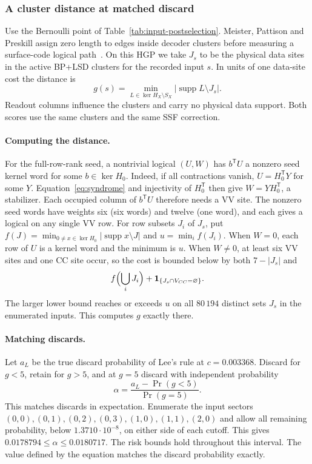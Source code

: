 \documentclass[10pt,twocolumn]{article}
\theoremstyle{definition}
\DeclareMathOperator{\supp}{supp}
\begin{document}
\subsubsection{A cluster distance at matched discard}\label{app:cluster-distance}
Use the Bernoulli point of Table~\ref{tab:input-postselection}.
Meister, Pattison and Preskill assign zero length to edges inside
decoder clusters before measuring a surface-code logical
path~\cite[Def.~9 and Alg.~2]{MPP24}. On this HGP we take $J_s$ to
be the physical data sites in the active BP+LSD clusters for the
recorded input $s$. In units of one data-site cost the distance is
\[
 g(s)=\min_{L\in\ker H_X\setminus S_X}|\supp L\setminus J_s|.
\]
Readout columns influence the clusters and carry no physical data
support. Both scores use the same clusters and the same SSF correction.

\paragraph{Computing the distance.}
For the full-row-rank seed, a nontrivial logical $(U,W)$ has
$b^{\mathsf T}U$ a nonzero seed kernel word for some $b\in\ker H_0$.
Indeed, if all contractions vanish, $U=H_0^{\mathsf T}Y$ for some
$Y$. Equation~\eqref{eq:syndrome} and injectivity of $H_0^{\mathsf T}$
then give $W=YH_0^{\mathsf T}$, a stabilizer. Each occupied column
of $b^{\mathsf T}U$ therefore needs a VV site. The nonzero seed words
have weights six (six words) and twelve (one word), and each gives a
logical on any single VV row. For row subsets $J_i$ of $J_s$, put
$f(J)=\min_{0\ne x\in\ker H_0}|\supp x\setminus J|$ and
$u=\min_i f(J_i)$. When $W=0$, each row of $U$ is a kernel word and
the minimum is $u$. When $W\ne0$, at least six VV sites and one CC
site occur, so the cost is bounded below by both $7-|J_s|$ and
\[
 f\Bigl(\bigcup_iJ_i\Bigr)+\mathbf1_{\{J_s\cap V_{CC}=\varnothing\}}.
\]
The larger lower bound reaches or exceeds $u$ on all $80\,194$ distinct
sets $J_s$ in the enumerated inputs. This computes $g$ exactly there.

\paragraph{Matching discards.}
Let $a_L$ be the true discard probability of Lee's rule at
$c=0.003368$. Discard for $g<5$, retain for $g>5$, and at $g=5$
discard with independent probability
\[
 \alpha=\frac{a_L-\Pr(g<5)}{\Pr(g=5)} .
\]
This matches discards in expectation. Enumerate the input sectors
$(0,0),(0,1),(0,2),(0,3),(1,0),(1,1),(2,0)$ and allow all remaining
probability, below $1.3710\cdot10^{-8}$, on either side of each
cutoff. This gives $0.0178794\le\alpha\le0.0180717$. The risk bounds
hold throughout this interval. The value defined by the equation
matches the discard probability exactly.
\end{document}
